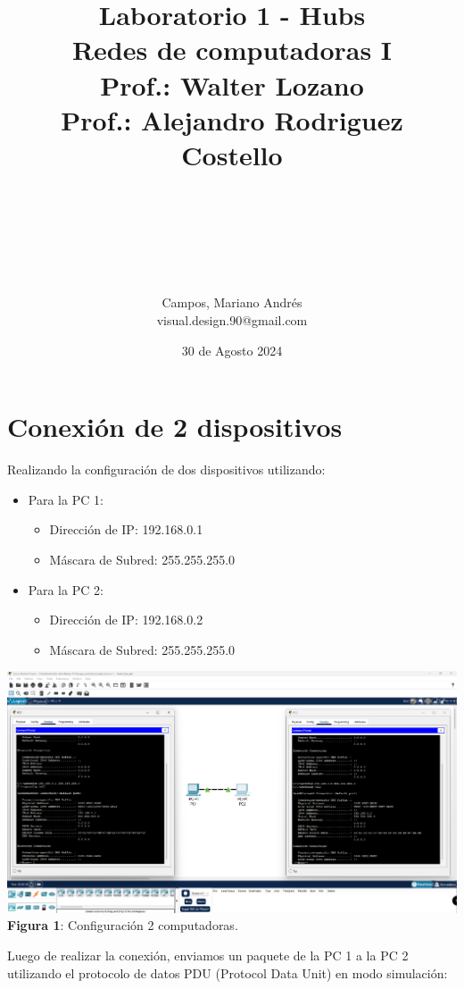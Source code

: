 \documentclass{article}
\title{\bfseries \huge Laboratorio 1 - Hubs \normalsize{\linebreak\\Redes de computadoras I \\Prof.: Walter Lozano\\Prof.: Alejandro Rodriguez Costello}}
\author{\\\\\\\\\\\\Campos, Mariano Andrés \\ {\small visual.design.90@gmail.com}}
\date{\small 30 de Agosto 2024}
\begin{document}
    \maketitle
    \newpage

    \section{Conexión de 2 dispositivos}
    Realizando la configuración de dos dispositivos utilizando:
    \begin{itemize}
        \item Para la PC 1:
            \begin{itemize}
                \item Dirección de IP: 192.168.0.1
                \item Máscara de Subred: 255.255.255.0
            \end{itemize}
        \item Para la PC 2:
            \begin{itemize}
                \item Dirección de IP: 192.168.0.2
                \item Máscara de Subred: 255.255.255.0
            \end{itemize}
    \end{itemize}

    \begin{center}
        \includegraphics[width=0.65\linewidth]{img_01} 
        \linebreak
        \small {\bfseries Figura 1}: Configuración 2 computadoras.
    \end{center}

    Luego de realizar la conexión, enviamos un paquete de la PC 1 a la PC 2 utilizando el protocolo de datos PDU (Protocol Data Unit) en modo simulación:
\end{document}
